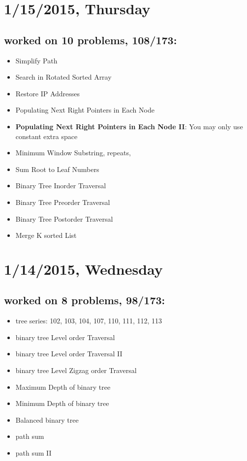 \documentclass[9pt,b5paper]{article}
\begin{document}
\section{1/15/2015, Thursday}
\label{sec-9}
\subsection{worked on 10 problems, 108/173:}
\label{sec-9-1}
\begin{itemize}
\item Simplify Path
\item Search in Rotated Sorted Array
\item Restore IP Addresses
\item Populating Next Right Pointers in Each Node
\item \textbf{Populating Next Right Pointers in Each Node II}: You may only use constant extra space
\item Minimum Window Substring, repeats,
\item Sum Root to Leaf Numbers
\item Binary Tree Inorder Traversal
\item Binary Tree Preorder Traversal
\item Binary Tree Postorder Traversal
\item Merge K sorted List
\end{itemize}
\section{1/14/2015, Wednesday}
\label{sec-10}
\subsection{worked on 8 problems, 98/173:}
\label{sec-10-1}
\begin{itemize}
\item tree series: 102, 103, 104, 107, 110, 111, 112, 113
\item binary tree Level order Traversal
\item binary tree Level order Traversal II
\item binary tree Level Zigzag order Traversal
\item Maximum Depth of binary tree
\item Minimum Depth of binary tree
\item Balanced binary tree
\item path sum
\item path sum II
\end{itemize}
\end{document}
